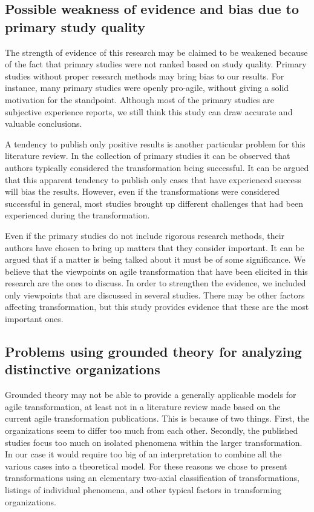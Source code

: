 \subsection{Possible weakness of evidence and bias due to primary study quality}

The strength of evidence of this research may be claimed to be weakened because
of the fact that primary studies were not ranked based on study quality. Primary
studies without proper research methods may bring bias to our results. For
instance, many primary studies were openly pro-agile, without giving a solid
motivation for the standpoint. 
Although most of the primary studies are subjective experience reports, we still
think this study can draw accurate and valuable conclusions.

A tendency to publish only positive results is another particular problem for
this literature review. In the collection of primary studies it can be observed
that authors typically considered the transformation being successful.
It can be argued that this apparent tendency to publish only cases that have
experienced success will bias the results.
However, even if the transformations were considered successful in general, most
studies brought up different challenges that had been experienced during the
transformation.

Even if the primary studies do not include rigorous research methods, their
authors have chosen to bring up matters that they consider important. It can be
argued that if a matter is being talked about it must be of some significance.
We believe that the viewpoints on agile transformation that have been elicited
in this research are the ones to discuss.
In order to strengthen the evidence, we included only viewpoints that are
discussed in several studies.
There may be other factors affecting transformation, but this study provides
evidence that these are the most important ones.

\subsection{Problems using grounded theory for analyzing distinctive organizations}

Grounded theory may not be able to provide a generally applicable models for
agile transformation, at least not in a literature review made based on the
current agile transformation publications. This is because of two things.
First, the organizations seem to differ too much from each other. Secondly, the
published studies focus too much on isolated phenomena within the larger
transformation.
In our case it would require too big of an interpretation to combine all the
various cases into a theoretical model. For these reasons we chose to present
transformations using an elementary two-axial classification of transformations,
listings of individual phenomena, and other typical factors in transforming
organizations.

